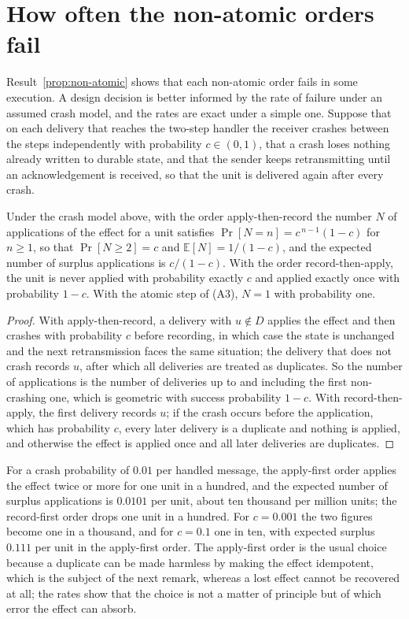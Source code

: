 \section{How often the non-atomic orders fail}\label{sec:fail-rates}

Result~\ref{prop:non-atomic} shows that each non-atomic order fails in some execution. A design decision is better informed by the rate of failure under an assumed crash model, and the rates are exact under a simple one. Suppose that on each delivery that reaches the two-step handler the receiver crashes between the steps independently with probability $c\in(0,1)$, that a crash loses nothing already written to durable state, and that the sender keeps retransmitting until an acknowledgement is received, so that the unit is delivered again after every crash.

\begin{newresult}\label{prop:fail-rates}
Under the crash model above, with the order apply-then-record the number $N$ of applications of the effect for a unit satisfies $\Pr[N=n]=c^{\,n-1}(1-c)$ for $n\ge1$, so that $\Pr[N\ge2]=c$ and $\mathbb E[N]=1/(1-c)$, and the expected number of surplus applications is $c/(1-c)$. With the order record-then-apply, the unit is never applied with probability exactly $c$ and applied exactly once with probability $1-c$. With the atomic step of (A3), $N=1$ with probability one.
\end{newresult}
\begin{proof}
With apply-then-record, a delivery with $u\notin D$ applies the effect and then crashes with probability $c$ before recording, in which case the state is unchanged and the next retransmission faces the same situation; the delivery that does not crash records $u$, after which all deliveries are treated as duplicates. So the number of applications is the number of deliveries up to and including the first non-crashing one, which is geometric with success probability $1-c$. With record-then-apply, the first delivery records $u$; if the crash occurs before the application, which has probability $c$, every later delivery is a duplicate and nothing is applied, and otherwise the effect is applied once and all later deliveries are duplicates.
\end{proof}

For a crash probability of $0.01$ per handled message, the apply-first order applies the effect twice or more for one unit in a hundred, and the expected number of surplus applications is $0.0101$ per unit, about ten thousand per million units; the record-first order drops one unit in a hundred. For $c=0.001$ the two figures become one in a thousand, and for $c=0.1$ one in ten, with expected surplus $0.111$ per unit in the apply-first order. The apply-first order is the usual choice because a duplicate can be made harmless by making the effect idempotent, which is the subject of the next remark, whereas a lost effect cannot be recovered at all; the rates show that the choice is not a matter of principle but of which error the effect can absorb.

